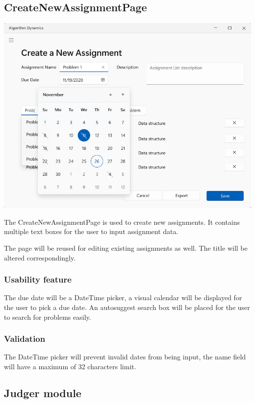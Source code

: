 \documentclass[a4paper]{report}
\begin{document}
\subsection{CreateNewAssignmentPage}

\includegraphics[width=\textwidth, height=\textheight, keepaspectratio]{CreateNewAssignmentPage-design}

The CreateNewAssignmentPage is used to create new assignments. It contains multiple text boxes for the user to input assignment data.

The page will be reused for editing existing assignments as well. The title will be altered correspondingly.

\subsubsection{Usability feature}

The due date will be a DateTime picker, a visual calendar will be displayed for the user to pick a due date. An autosuggest search box will be placed for the user to search for problems easily.

\subsubsection{Validation}

The DateTime picker will prevent invalid dates from being input, the name field will have a maximum of 32 characters limit.

\subsection{Judger module}
\end{document}
